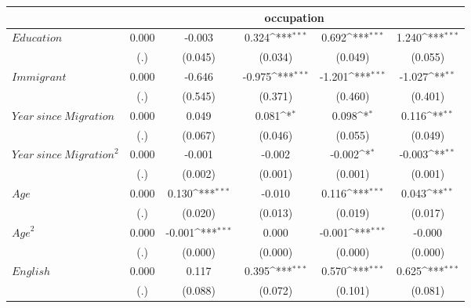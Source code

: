 {
\def\sym#1{\ifmmode^{#1}\else\(^{#1}\)\fi}
\begin{tabular}{l*{5}{c}}
\hline\hline
            &\multicolumn{5}{c}{occupation}                                                                               \\
\hline
$\mathit{Education}$&       0.000         &      -0.003         &       0.324\sym{***}&       0.692\sym{***}&       1.240\sym{***}\\
            &         (.)         &     (0.045)         &     (0.034)         &     (0.049)         &     (0.055)         \\
$\mathit{Immigrant}$&       0.000         &      -0.646         &      -0.975\sym{***}&      -1.201\sym{***}&      -1.027\sym{**} \\
            &         (.)         &     (0.545)         &     (0.371)         &     (0.460)         &     (0.401)         \\
$\mathit{Year\ since\ Migration}$&       0.000         &       0.049         &       0.081\sym{*}  &       0.098\sym{*}  &       0.116\sym{**} \\
            &         (.)         &     (0.067)         &     (0.046)         &     (0.055)         &     (0.049)         \\
$\mathit{Year\ since\ Migration}^2$&       0.000         &      -0.001         &      -0.002         &      -0.002\sym{*}  &      -0.003\sym{**} \\
            &         (.)         &     (0.002)         &     (0.001)         &     (0.001)         &     (0.001)         \\
$\mathit{Age}$&       0.000         &       0.130\sym{***}&      -0.010         &       0.116\sym{***}&       0.043\sym{**} \\
            &         (.)         &     (0.020)         &     (0.013)         &     (0.019)         &     (0.017)         \\
$\mathit{Age}^2$&       0.000         &      -0.001\sym{***}&       0.000         &      -0.001\sym{***}&      -0.000         \\
            &         (.)         &     (0.000)         &     (0.000)         &     (0.000)         &     (0.000)         \\
$\mathit{English}$&       0.000         &       0.117         &       0.395\sym{***}&       0.570\sym{***}&       0.625\sym{***}\\
            &         (.)         &     (0.088)         &     (0.072)         &     (0.101)         &     (0.081)         \\

\end{tabular}}
